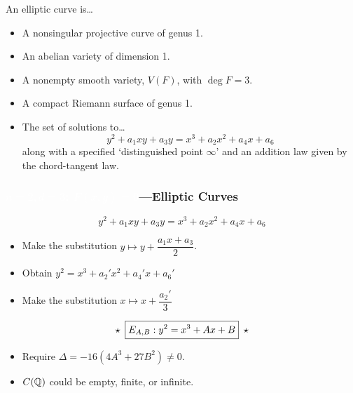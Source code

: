 
\begin{frame}[plain] 
\end{frame}



\begin{frame}[plain]
\begin{dfn}
An elliptic curve is\dots
\begin{itemize}
\item A nonsingular projective curve of genus 1.
\item An abelian variety of dimension 1.
\item A nonempty smooth variety, $V(F)$, with $\deg F=3$.
\item A compact Riemann surface of genus 1.
\item The set of solutions to\dots
	\[
	y^2 + a_1 xy + a_3y = x^3 + a_2 x^2 + a_4 x + a_6
	\]
along with a specified `distinguished point $\infty$' and an addition law given by the chord-tangent law.
\end{itemize}
\end{dfn}
\end{frame}



\begin{frame}[plain]
\frametitle{\textcolor{white}{$n=2, d=3$: $F(x,y)=0$}---Elliptic Curves}
	\[
	y^2 + a_1 xy + a_3y = x^3 + a_2 x^2 + a_4 x + a_6
	\] \pspace 

\begin{itemize}
\item Make the substitution $y \mapsto y + \dfrac{a_1 x+a_3}{2}$.
\item Obtain $y^2= x^3+ a_2' x^2 + a_4' x + a_6'$
\item Make the substitution $x \mapsto x + \dfrac{a_2'}{3}$
\end{itemize} \pspace 
	\[
	\star \enskip \boxed{E_{A,B}: y^2 = x^3 + Ax + B} \enskip \star
	\] \pspace

\begin{itemize}
\item Require $\Delta= -16(4A^3+27B^2) \neq 0$.
\item $C(\mathbb{Q})$ could be empty, finite, or infinite. 
\end{itemize}
\end{frame}



